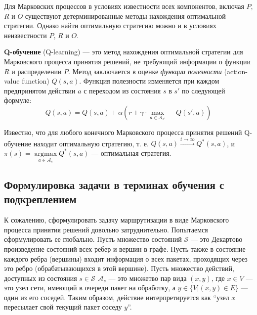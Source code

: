 \documentclass[specification, annotation]{itmo-student-thesis}
\DeclareMathOperator{\argmax}{argmax}
\begin{document}
Для Марковских процессов в условиях известности всех компонентов, включая $P$,
$R$ и $O$ существуют детерминированные методы нахождения оптимальной стратегии.
Однако найти оптимальную стратегию можно и в условиях неизвестности $P$, $R$ и $O$.

\textbf{Q-обучение} (Q-learning)\cite{q-learning-orig} --- это метод нахождения
оптимальной стратегии для Марковского процесса принятия решений, не требующий
информации о функции $R$ и распределении $P$. Метод заключается в оценке
\textit{функции полезности} (action-value function)
$Q(s,a)$. Функция полезности изменяется при каждом предпринятом действии $a$ с
переходом из состояния $s$ в $s'$ по следующей формуле:
\[
Q(s, a) = Q(s, a) + \alpha \left( r +
\gamma \cdot \max\limits_{a \in \mathcal{A}_{s'}} - Q(s', a) \right)
\]

Известно, что для любого конечного Марковского процесса принятия решений
Q-обучение находит оптимальную стратегию, т. е. $Q(s, a) \xrightarrow{t
  \rightarrow \infty} Q^*(s, a)$, и $\pi(s) = \argmax\limits_{a \in
  \mathcal{A}_s} {Q^*(s, a)}$ --- оптимальная стратегия.

\subsection{Формулировка задачи в терминах обучения с подкреплением}\label{rl-task-formulation}

К сожалению, сформулировать задачу маршрутизации в виде Марковского процесса
принятия решений довольно затруднительно. Попытаемся сформулировать ее
глобально. Пусть множество состояний $\mathcal{S}$ --- это Декартово произведение
состояний всех ребер и вершин в графе. Пусть также в состояние каждого ребра
(вершины) входит информация о всех пакетах, проходящих через это ребро
(обрабатывающихся в этой вершине). Пусть множество действий, доступных из
состояния $s \in \mathcal{S}$ $\mathcal{A}_s$ --- это множетво пар вида $(x,y)$,
где $x \in V$ --- это узел сети, имеющий в очереди пакет на обработку, а
$y \in \{V | (x, y) \in E\}$ --- один из его соседей. Таким образом, действие
интерпретируется как ``узел $x$ пересылает свой текущий пакет соседу $y$''.
\end{document}
